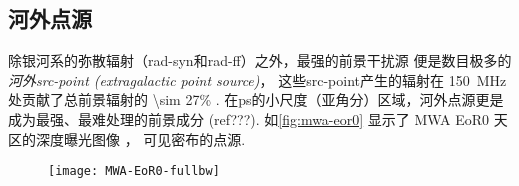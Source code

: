 \subsection{河外点源}

除银河系的弥散辐射（\ac{rad-syn}和\ac{rad-ff}）之外，最强的前景干扰源
便是数目极多的\emph{河外\acs{src-point} (extragalactic point source)}，
这些\ac{src-point}产生的辐射在 \SI{150}{\MHz} 处贡献了总前景辐射的
\num{\sim 27}\% \cite{shaver1999}.
在\ac{ps}的小尺度（亚角分）区域，河外点源更是成为最强、最难处理的前景成分 (ref???).
如\autoref{fig:mwa-eor0} 显示了 MWA EoR0 天区的深度曝光图像 \cite{offringa2016}，
可见密布的点源.

\begin{figure}[htp]
  \centering
  \texttt{[image: MWA-EoR0-fullbw]}
  \label{fig:mwa-eor0}
\end{figure}

